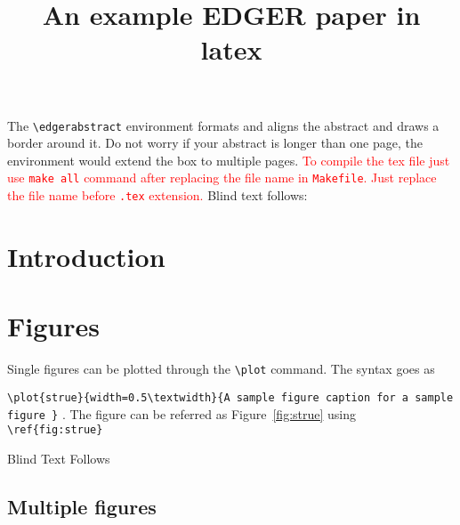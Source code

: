 \documentclass{edger}
\begin{document}
\thispagestyle{new}
\title{An example EDGER paper in latex
}





\institution{}

\begin{edgerabstract}
The \verb|\edgerabstract| environment formats and aligns the abstract and draws a border around it. Do not worry if your abstract is longer than one page, the environment would extend the box to multiple pages. \textcolor{red}{To compile the tex file just use \texttt{make all} command after replacing the file name in \texttt{Makefile}. Just replace the file name before \texttt{.tex} extension.} Blind text follows: \lipsum[1]
\end{edgerabstract}



\section*{Introduction}

\lipsum[1-7]   


\section*{Figures}

Single figures can be plotted through the \verb|\plot| command. The syntax goes as

 \verb|\plot{strue}{width=0.5\textwidth}{A sample figure caption for a sample figure }| .
 The figure can be referred as Figure~\ref{fig:strue} using \verb|\ref{fig:strue}|



Blind Text Follows
\lipsum[1-7]  
\subsection*{Multiple  figures}
\end{document}
